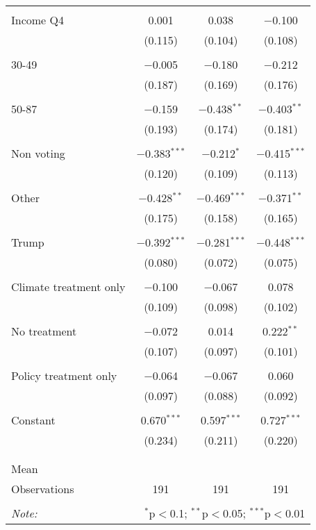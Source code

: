 \begin{tabular}{@{\extracolsep{5pt}}lccc}
  & & & \\ 
 Income Q4 & 0.001 & 0.038 & $-$0.100 \\ 
  & (0.115) & (0.104) & (0.108) \\ 
  & & & \\ 
 30-49 & $-$0.005 & $-$0.180 & $-$0.212 \\ 
  & (0.187) & (0.169) & (0.176) \\ 
  & & & \\ 
 50-87 & $-$0.159 & $-$0.438$^{**}$ & $-$0.403$^{**}$ \\ 
  & (0.193) & (0.174) & (0.181) \\ 
  & & & \\ 
 Non voting & $-$0.383$^{***}$ & $-$0.212$^{*}$ & $-$0.415$^{***}$ \\ 
  & (0.120) & (0.109) & (0.113) \\ 
  & & & \\ 
 Other & $-$0.428$^{**}$ & $-$0.469$^{***}$ & $-$0.371$^{**}$ \\ 
  & (0.175) & (0.158) & (0.165) \\ 
  & & & \\ 
 Trump & $-$0.392$^{***}$ & $-$0.281$^{***}$ & $-$0.448$^{***}$ \\ 
  & (0.080) & (0.072) & (0.075) \\ 
  & & & \\ 
 Climate treatment only & $-$0.100 & $-$0.067 & 0.078 \\ 
  & (0.109) & (0.098) & (0.102) \\ 
  & & & \\ 
 No treatment & $-$0.072 & 0.014 & 0.222$^{**}$ \\ 
  & (0.107) & (0.097) & (0.101) \\ 
  & & & \\ 
 Policy treatment only & $-$0.064 & $-$0.067 & 0.060 \\ 
  & (0.097) & (0.088) & (0.092) \\ 
  & & & \\ 
 Constant & 0.670$^{***}$ & 0.597$^{***}$ & 0.727$^{***}$ \\ 
  & (0.234) & (0.211) & (0.220) \\ 
  & & & \\ 
\hline \\[-1.8ex] 
Mean &  &  &  \\ 
Observations & 191 & 191 & 191 \\ 
\hline 
\hline \\[-1.8ex] 
\textit{Note:}  & \multicolumn{3}{r}{$^{*}$p$<$0.1; $^{**}$p$<$0.05; $^{***}$p$<$0.01} \\ 
\end{tabular} 
